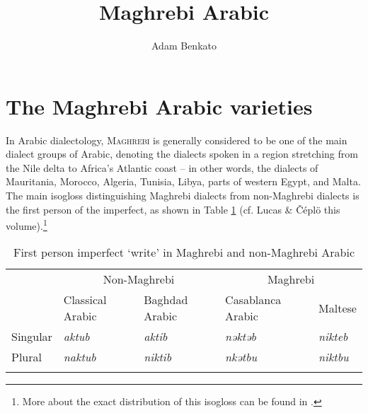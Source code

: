 \documentclass[output=paper]{langsci/langscibook}
\author{Adam Benkato\affiliation{University of California, Berkeley}}
\title{Maghrebi Arabic}
\begin{document}
  
\section{The Maghrebi Arabic varieties}

In Arabic dialectology, \textsc{Maghrebi} is generally considered to be one of the main dialect groups of Arabic, denoting the dialects spoken in a region stretching from the Nile delta to Africa’s Atlantic coast -- in other words, the dialects of Mauritania, Morocco, Algeria, Tunisia, Libya, parts of western Egypt, and Malta. The main isogloss distinguishing Maghrebi dialects from non-Maghrebi dialects is the first person of the imperfect, as shown in Table \ref{tab:1:niktib} (cf. Lucas \& Čéplö this volume).\footnote{More about the exact distribution of this isogloss can be found in \citet{Behnstedt2016niktib}.}


\begin{table}
\caption{First person imperfect `write' in Maghrebi and non-Maghrebi Arabic}
\label{tab:1:niktib}
 \begin{tabular}{lllll} 
  \lsptoprule
         & \multicolumn{2}{c}{Non-Maghrebi}       & \multicolumn{2}{c}{Maghrebi} \\
         & Classical Arabic & Baghdad Arabic & Casablanca Arabic & Maltese \\
           \midrule
Singular & \textit{aktub}            & \textit{aktib}          & \textit{nəktəb}            & \textit{nikteb}  \\
Plural   & \textit{naktub}           & \textit{niktib}         & \textit{nkətbu}            & \textit{niktbu}  \\
\lspbottomrule
\end{tabular}
\end{table}
\end{document}
